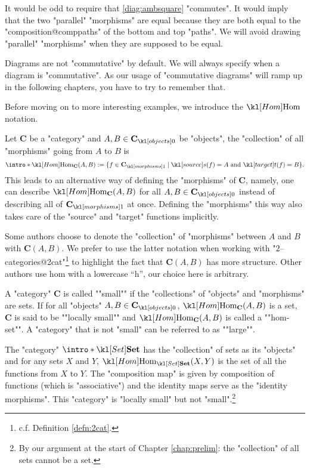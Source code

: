 \documentclass[main.tex]{subfiles}
\begin{document}
\begin{exmps}
	It would be odd to require that \eqref{diag:ambsquare} "commutes". It would imply that the two "parallel" "morphisms" are equal because they are both equal to the "composition@comppaths" of the bottom and top "paths". We will avoid drawing "parallel" "morphisms" when they are supposed to be equal.
\end{exmps}
\begin{warn}
	Diagrams are not "commutative" by default. We will always specify when a diagram is "commutative". As our usage of "commutative diagrams" will ramp up in the following chapters, you have to try to remember that. 
\end{warn}

Before moving on to more interesting examples, we introduce the $\Hom$ notation.
\begin{defn}[$\Hom$]
	\AP Let $\mathbf{C}$ be a "category" and $A,B \in \obj{\mathbf{C}}$ be "objects", the "collection" of all "morphisms" going from $A$ to $B$ is 
	\[\intro*\Hom_{\mathbf{C}}(A,B) := \{f \in \mor{\mathbf{C}} \mid \source(f) = A \text{ and } \target(f) = B\}.\]
	This leads to an alternative way of defining the "morphisms" of $\mathbf{C}$, namely, one can describe $\Hom_{\mathbf{C}}(A,B)$ for all $A, B \in \obj{\mathbf{C}}$ instead of describing all of $\mor{\mathbf{C}}$ at once. Defining the "morphisms" this way also takes care of the "source" and "target" functions implicitly.
\end{defn}
\begin{rem}[Notation]
    Some authors choose to denote the "collection" of "morphisms" between $A$ and $B$ with $\mathbf{C}(A,B)$. We prefer to use the latter notation when working with "$2$--categories@2cat"\footnote{c.f. Definition \ref{defn:2cat}.} to highlight the fact that $\mathbf{C}(A,B)$ has more structure. Other authors use $\mathrm{hom}$ with a lowercase ``h'', our choice here is arbitrary.
\end{rem}
\begin{defn}[Smallness]
	\AP A "category" $\mathbf{C}$ is called ""small"" if the "collections" of "objects" and "morphisms" are sets. \AP If for all "objects" $A,B \in \obj{\mathbf{C}}$, $\Hom_{\mathbf{C}}(A,B)$ is a set, $\mathbf{C}$ is said to be ""locally small"" and $\Hom_{\mathbf{C}}(A,B)$ is called a ""hom-set"". \AP A "category" that is not "small" can be referred to as ""large"".%
\end{defn}
\begin{exmp}[$\catSet$]
	\AP The "category" $\intro*\catSet$ has the "collection" of sets as its "objects" and for any sets $X$ and $Y$, $\Hom_{\catSet}(X,Y)$ is the set of all the functions from $X$ to $Y$. The "composition map" is given by composition of functions (which is "associative") and the identity maps serve as the "identity morphisms". This "category" is "locally small" but not "small".\footnote{By our argument at the start of Chapter \ref{chap:prelim}: the "collection" of all sets cannot be a set.}
\end{exmp}
\end{document}
